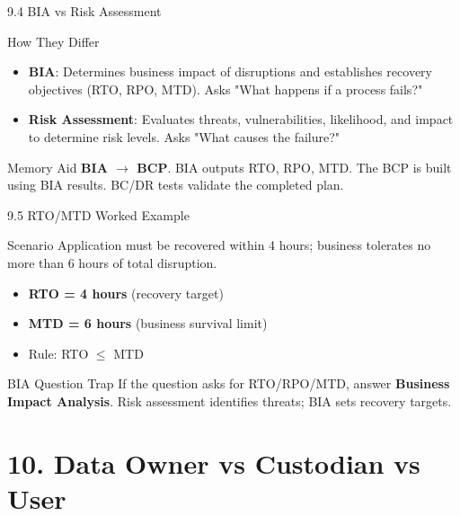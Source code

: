 \documentclass{beamer}
\begin{document}
	\begin{frame}{9.4 BIA vs Risk Assessment}
		\begin{block}{How They Differ}
			\begin{itemize}
				\item \textbf{BIA}: Determines business impact of disruptions and establishes recovery objectives (RTO, RPO, MTD). Asks "What happens if a process fails?"
				\item \textbf{Risk Assessment}: Evaluates threats, vulnerabilities, likelihood, and impact to determine risk levels. Asks "What causes the failure?"
			\end{itemize}
		\end{block}
		
		\begin{alertblock}{Memory Aid}
			\textbf{BIA $\rightarrow$ BCP}. BIA outputs RTO, RPO, MTD. The BCP is built using BIA results. BC/DR tests validate the completed plan.
		\end{alertblock}
	\end{frame}
	
	\begin{frame}{9.5 RTO/MTD Worked Example}
		\begin{block}{Scenario}
			Application must be recovered within 4 hours; business tolerates no more than 6 hours of total disruption.
		\end{block}
		
		\begin{itemize}
			\item \textbf{RTO = 4 hours} (recovery target)
			\item \textbf{MTD = 6 hours} (business survival limit)
			\item Rule: RTO $\le$ MTD
		\end{itemize}
		
		\begin{alertblock}{BIA Question Trap}
			If the question asks for RTO/RPO/MTD, answer \textbf{Business Impact Analysis}. Risk assessment identifies threats; BIA sets recovery targets.
		\end{alertblock}
	\end{frame}
	
	\section{10. Data Owner vs Custodian vs User}
	
\end{document}
